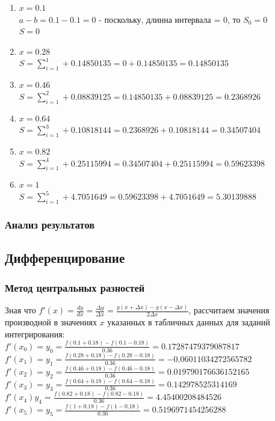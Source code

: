 \documentclass{article}
\begin{document}
\begin{enumerate}[label= \arabic{*}:]
  \item 
  $ x = 0.1$ \\
  $a-b = 0.1 - 0.1 = 0$ - поскольку, длинна интервала = 0, то $S_0 = 0$\\
  $S = 0$

  \item 
  $ x = 0.28$ \\ 
  $S = \sum\limits_{i=1}^1 + 0.14850135 = 0 + 0.14850135 = 0.14850135$ \\
  
  \item 
  $ x = 0.46$ \\
  $S = \sum\limits_{i=1}^2 + 0.08839125 = 0.14850135 + 0.08839125 = 0.2368926$\\
  
  \item 
  $ x = 0.64$ \\
  $S = \sum\limits_{i=1}^3 + 0.10818144 = 0.2368926 + 0.10818144 = 0.34507404$\\
  
  \item 
  $ x = 0.82$ \\
  $S = \sum\limits_{i=1}^4 + 0.25115994 = 0.34507404 + 0.25115994 = 0.59623398$\\
  
  \item 
  $ x = 1$ \\
  $S = \sum\limits_{i=1}^5 + 4.7051649 = 0.59623398 + 4.7051649 = 5.30139888$\\
  
\end{enumerate}

\subsubsection{Анализ результатов}
\subsection{Дифференцирование}
\subsubsection{Метод центральных разностей}
Зная что $ f'(x) = 
 \frac{dy}{dx} =
 \frac{\Delta y}{\Delta x} =
 \frac{y(x + \Delta x) - y(x - \Delta x)}{2 \Delta x}$, рассчитаем значения
 производной в значениях $x$ указанных в табличных данных для заданий
 интегрирования: \\ 
$f'(x_{0}) = y_{0} = \frac{f(0.1 + 0.18) - f(0.1 - 0.18)}{0.36 } =0.17287479379087817$\\
$f'(x_{1})=y_{1} = \frac{f(0.28 + 0.18) - f(0.28 - 0.18)}{0.36 } =
-0.06011034272565782$\\
$f'(x_{2})=y_{2} = \frac{f(0.46 + 0.18) - f(0.46 - 0.18)}{0.36 } =
0.019790176636152165$\\
$f'(x_{3})=y_{3} = \frac{f(0.64 + 0.18) - f(0.64 - 0.18)}{0.36 } =
0.142978525314169 $\\
$f'(x_{4})y_{4} = \frac{f(0.82 + 0.18) - f(0.82 - 0.18)}{0.36 } =
4.45400208484526 $\\
$f'(x_{5})=y_{5} = \frac{f(1 + 0.18) - f(1 - 0.18)}{0.36 } = 0.5196971454256288
$
\end{document}
